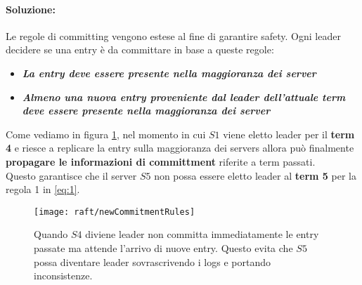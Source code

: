   \paragraph{Soluzione:}
  Le regole di committing vengono estese al fine di garantire safety. Ogni leader decidere se una entry è da committare in base a queste regole:
  \begin{itemize}
    \item{\emph{\textbf{La entry deve essere presente nella maggioranza dei server}}}
    \item{\emph{\textbf{Almeno una nuova entry proveniente dal leader dell'attuale term deve essere presente nella maggioranza dei server}}}
  \end{itemize}
  Come vediamo in figura \ref{fig:figure13}, nel momento in cui $S1$ viene eletto leader per il \textbf{term 4} e riesce a replicare la entry sulla maggioranza dei servers allora può finalmente \textbf{propagare le informazioni di committment} riferite a term passati.\\
  Questo garantisce che il server $S5$ non possa essere eletto leader al \textbf{term 5} per la regola 1 in \ref{eq:1}.
  \begin{figure}[H]
    \centering
    \texttt{[image: raft/newCommitmentRules]}
    \caption[stateDiagramCaption]{Quando $S4$ diviene leader non committa immediatamente le entry passate ma attende l'arrivo di nuove entry. Questo evita che $S5$ possa diventare leader sovrascrivendo i logs e portando inconsistenze.}
    \label{fig:figure13}
  \end{figure}
